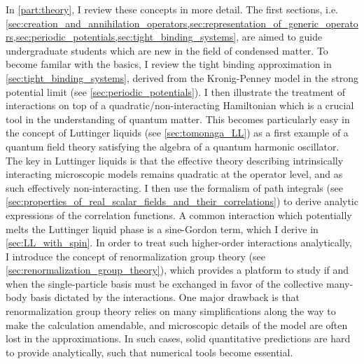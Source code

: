 In \cref{part:theory}, I review these concepts in more detail.
The first sections, i.e. \cref{sec:creation_and_annihilation_operators,sec:representation_of_generic_operators,sec:periodic_potentials,sec:tight_binding_systems}, are aimed to guide undergraduate students which are new in the field of condensed matter.
To become familar with the basics, I review the tight binding approximation in \cref{sec:tight_binding_systems}, derived from the Kronig-Penney model in the strong potential limit (see \cref{sec:periodic_potentials}).
I then illustrate the treatment of interactions on top of a quadratic/non-interacting Hamiltonian which is a crucial tool in the understanding of quantum matter.
This becomes particularly easy in the concept of Luttinger liquids (see \cref{sec:tomonaga_LL}) as a first example of a quantum field theory satisfying the algebra of a quantum harmonic oscillator.
The key in Luttinger liquids is that the effective theory describing intrinsically interacting microscopic models remains quadratic at the operator level, and as such effectively non-interacting.
I then use the formalism of path integrals (see \cref{sec:properties_of_real_scalar_fields_and_their_correlations}) to derive analytic expressions of the correlation functions.
A common interaction which potentially melts the Luttinger liquid phase is a sine-Gordon term, which I derive in \cref{sec:LL_with_spin}.
In order to treat such higher-order interactions analytically, I introduce the concept of renormalization group theory (see \cref{sec:renormalization_group_theory}), which provides a platform to study if and when the single-particle basis must be exchanged in favor of the collective many-body basis dictated by the interactions.
One major drawback is that renormalization group theory relies on many simplifications along the way to make the calculation amendable, and microscopic details of the model are often lost in the approximations.
In such cases, solid quantitative predictions are hard to provide analytically, such that numerical tools become essential.

